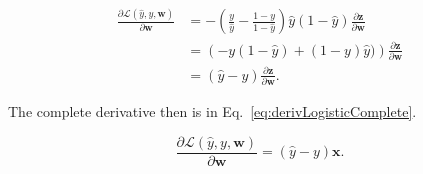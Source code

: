 \documentclass{report}
\newcommand{\yhat}{\hat{y}}
\begin{document}
  \begin{align}
    \frac{\partial \mathcal{L}(\yhat,y,\mathbf{w})}{\partial \mathbf{w}} &= -\left(  \frac{y}{\yhat} - \frac{1-y}{1-\yhat} \right) \yhat(1-\yhat) \frac{\partial \mathbf{z}}{\partial \mathbf{w}}\\
    &= \left( -y(1 - \yhat) + (1-y) \yhat) \right) \frac{\partial \mathbf{z}}{\partial \mathbf{w}}\\
    &= \left( \yhat - y \right) \frac{\partial \mathbf{z}}{\partial \mathbf{w}} \textrm{.}
    \label{eq:derivLogistic}
  \end{align}

  \noindent
  The complete derivative then is in Eq.~\eqref{eq:derivLogisticComplete}.
  
  \begin{equation}
    \frac{\partial \mathcal{L}(\yhat,y,\mathbf{w})}{\partial \mathbf{w}} = \left( \yhat - y \right) \mathbf{x} \textrm{.}
    \label{eq:derivLogisticComplete}
  \end{equation}
  
\end{document}
